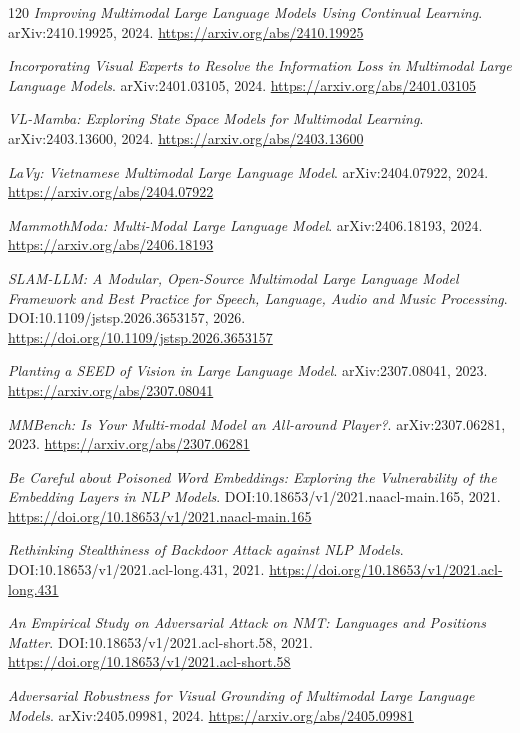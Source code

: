 \documentclass[11pt,a4paper]{article}
\begin{document}
\begin{thebibliography}{120}
\newblock \emph{Improving Multimodal Large Language Models Using Continual Learning}.
\newblock arXiv:2410.19925, 2024.
\newblock \url{https://arxiv.org/abs/2410.19925}

\newblock \emph{Incorporating Visual Experts to Resolve the Information Loss in Multimodal Large Language Models}.
\newblock arXiv:2401.03105, 2024.
\newblock \url{https://arxiv.org/abs/2401.03105}

\newblock \emph{VL-Mamba: Exploring State Space Models for Multimodal Learning}.
\newblock arXiv:2403.13600, 2024.
\newblock \url{https://arxiv.org/abs/2403.13600}

\newblock \emph{LaVy: Vietnamese Multimodal Large Language Model}.
\newblock arXiv:2404.07922, 2024.
\newblock \url{https://arxiv.org/abs/2404.07922}

\newblock \emph{MammothModa: Multi-Modal Large Language Model}.
\newblock arXiv:2406.18193, 2024.
\newblock \url{https://arxiv.org/abs/2406.18193}

\newblock \emph{SLAM-LLM: A Modular, Open-Source Multimodal Large Language Model Framework and Best Practice for Speech, Language, Audio and Music Processing}.
\newblock DOI:10.1109/jstsp.2026.3653157, 2026.
\newblock \url{https://doi.org/10.1109/jstsp.2026.3653157}

\newblock \emph{Planting a SEED of Vision in Large Language Model}.
\newblock arXiv:2307.08041, 2023.
\newblock \url{https://arxiv.org/abs/2307.08041}

\newblock \emph{MMBench: Is Your Multi-modal Model an All-around Player?}.
\newblock arXiv:2307.06281, 2023.
\newblock \url{https://arxiv.org/abs/2307.06281}

\newblock \emph{Be Careful about Poisoned Word Embeddings: Exploring the Vulnerability of the Embedding Layers in NLP Models}.
\newblock DOI:10.18653/v1/2021.naacl-main.165, 2021.
\newblock \url{https://doi.org/10.18653/v1/2021.naacl-main.165}

\newblock \emph{Rethinking Stealthiness of Backdoor Attack against NLP Models}.
\newblock DOI:10.18653/v1/2021.acl-long.431, 2021.
\newblock \url{https://doi.org/10.18653/v1/2021.acl-long.431}

\newblock \emph{An Empirical Study on Adversarial Attack on NMT: Languages and Positions Matter}.
\newblock DOI:10.18653/v1/2021.acl-short.58, 2021.
\newblock \url{https://doi.org/10.18653/v1/2021.acl-short.58}

\newblock \emph{Adversarial Robustness for Visual Grounding of Multimodal Large Language Models}.
\newblock arXiv:2405.09981, 2024.
\newblock \url{https://arxiv.org/abs/2405.09981}

\end{thebibliography}
\end{document}
